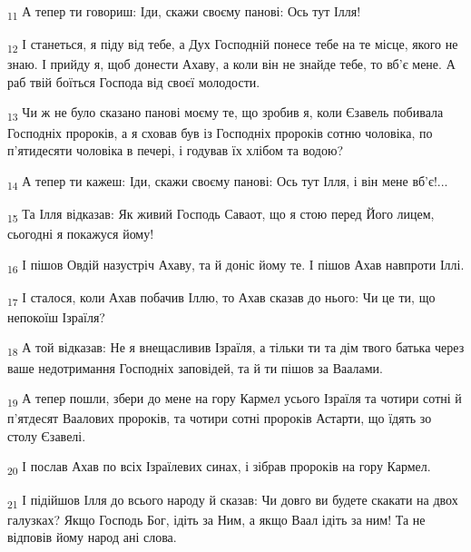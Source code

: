 \begin{tcolorbox}
\textsubscript{11} А тепер ти говориш: Іди, скажи своєму панові: Ось тут Ілля!
\end{tcolorbox}
\begin{tcolorbox}
\textsubscript{12} І станеться, я піду від тебе, а Дух Господній понесе тебе на те місце, якого не знаю. І прийду я, щоб донести Ахаву, а коли він не знайде тебе, то вб'є мене. А раб твій боїться Господа від своєї молодости.
\end{tcolorbox}
\begin{tcolorbox}
\textsubscript{13} Чи ж не було сказано панові моєму те, що зробив я, коли Єзавель побивала Господніх пророків, а я сховав був із Господніх пророків сотню чоловіка, по п'ятидесяти чоловіка в печері, і годував їх хлібом та водою?
\end{tcolorbox}
\begin{tcolorbox}
\textsubscript{14} А тепер ти кажеш: Іди, скажи своєму панові: Ось тут Ілля, і він мене вб'є!...
\end{tcolorbox}
\begin{tcolorbox}
\textsubscript{15} Та Ілля відказав: Як живий Господь Саваот, що я стою перед Його лицем, сьогодні я покажуся йому!
\end{tcolorbox}
\begin{tcolorbox}
\textsubscript{16} І пішов Овдій назустріч Ахаву, та й доніс йому те. І пішов Ахав навпроти Іллі.
\end{tcolorbox}
\begin{tcolorbox}
\textsubscript{17} І сталося, коли Ахав побачив Іллю, то Ахав сказав до нього: Чи це ти, що непокоїш Ізраїля?
\end{tcolorbox}
\begin{tcolorbox}
\textsubscript{18} А той відказав: Не я внещасливив Ізраїля, а тільки ти та дім твого батька через ваше недотримання Господніх заповідей, та й ти пішов за Ваалами.
\end{tcolorbox}
\begin{tcolorbox}
\textsubscript{19} А тепер пошли, збери до мене на гору Кармел усього Ізраїля та чотири сотні й п'ятдесят Ваалових пророків, та чотири сотні пророків Астарти, що їдять зо столу Єзавелі.
\end{tcolorbox}
\begin{tcolorbox}
\textsubscript{20} І послав Ахав по всіх Ізраїлевих синах, і зібрав пророків на гору Кармел.
\end{tcolorbox}
\begin{tcolorbox}
\textsubscript{21} І підійшов Ілля до всього народу й сказав: Чи довго ви будете скакати на двох галузках? Якщо Господь Бог, ідіть за Ним, а якщо Ваал ідіть за ним! Та не відповів йому народ ані слова.
\end{tcolorbox}
